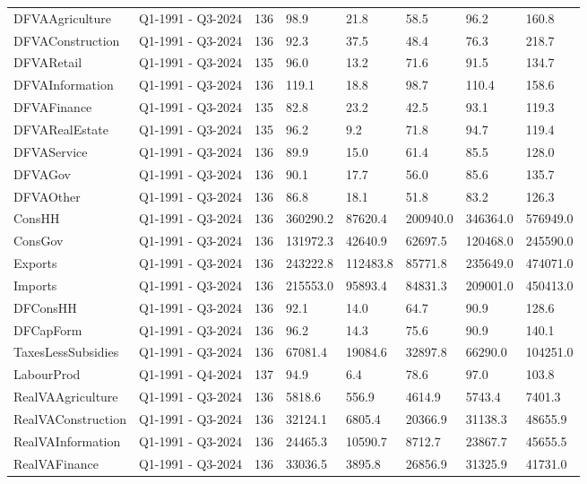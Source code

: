 \begin{longtable}[t]{llllllll}
DFVAAgriculture & Q1-1991 - Q3-2024 & 136 & 98.9 & 21.8 & 58.5 & 96.2 & 160.8\\
DFVAConstruction & Q1-1991 - Q3-2024 & 136 & 92.3 & 37.5 & 48.4 & 76.3 & 218.7\\
DFVARetail & Q1-1991 - Q3-2024 & 135 & 96.0 & 13.2 & 71.6 & 91.5 & 134.7\\
DFVAInformation & Q1-1991 - Q3-2024 & 136 & 119.1 & 18.8 & 98.7 & 110.4 & 158.6\\
\addlinespace
DFVAFinance & Q1-1991 - Q3-2024 & 135 & 82.8 & 23.2 & 42.5 & 93.1 & 119.3\\
DFVARealEstate & Q1-1991 - Q3-2024 & 135 & 96.2 & 9.2 & 71.8 & 94.7 & 119.4\\
DFVAService & Q1-1991 - Q3-2024 & 136 & 89.9 & 15.0 & 61.4 & 85.5 & 128.0\\
DFVAGov & Q1-1991 - Q3-2024 & 136 & 90.1 & 17.7 & 56.0 & 85.6 & 135.7\\
DFVAOther & Q1-1991 - Q3-2024 & 136 & 86.8 & 18.1 & 51.8 & 83.2 & 126.3\\
\addlinespace
ConsHH & Q1-1991 - Q3-2024 & 136 & 360290.2 & 87620.4 & 200940.0 & 346364.0 & 576949.0\\
ConsGov & Q1-1991 - Q3-2024 & 136 & 131972.3 & 42640.9 & 62697.5 & 120468.0 & 245590.0\\
Exports & Q1-1991 - Q3-2024 & 136 & 243222.8 & 112483.8 & 85771.8 & 235649.0 & 474071.0\\
Imports & Q1-1991 - Q3-2024 & 136 & 215553.0 & 95893.4 & 84831.3 & 209001.0 & 450413.0\\
DFConsHH & Q1-1991 - Q3-2024 & 136 & 92.1 & 14.0 & 64.7 & 90.9 & 128.6\\
\addlinespace
DFCapForm & Q1-1991 - Q3-2024 & 136 & 96.2 & 14.3 & 75.6 & 90.9 & 140.1\\
TaxesLessSubsidies & Q1-1991 - Q3-2024 & 136 & 67081.4 & 19084.6 & 32897.8 & 66290.0 & 104251.0\\
LabourProd & Q1-1991 - Q4-2024 & 137 & 94.9 & 6.4 & 78.6 & 97.0 & 103.8\\
RealVAAgriculture & Q1-1991 - Q3-2024 & 136 & 5818.6 & 556.9 & 4614.9 & 5743.4 & 7401.3\\
RealVAConstruction & Q1-1991 - Q3-2024 & 136 & 32124.1 & 6805.4 & 20366.9 & 31138.3 & 48655.9\\
\addlinespace
RealVAInformation & Q1-1991 - Q3-2024 & 136 & 24465.3 & 10590.7 & 8712.7 & 23867.7 & 45655.5\\
RealVAFinance & Q1-1991 - Q3-2024 & 136 & 33036.5 & 3895.8 & 26856.9 & 31325.9 & 41731.0\\

\end{longtable}
